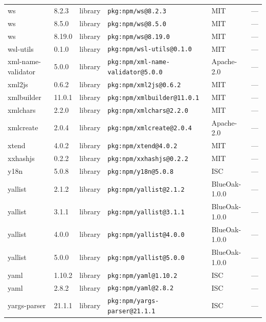 \documentclass[11pt,a4paper]{article}
\begin{document}
\begin{longtable}{|p{4cm}|p{2cm}|p{1.6cm}|p{5cm}|p{1.5cm}|p{3.5cm}|}
\raggedright ws & 8.2.3 & library & \small\texttt{pkg:npm/ws@8.2.3} & MIT & \small — \\
\raggedright ws & 8.5.0 & library & \small\texttt{pkg:npm/ws@8.5.0} & MIT & \small — \\
\raggedright ws & 8.19.0 & library & \small\texttt{pkg:npm/ws@8.19.0} & MIT & \small — \\
\raggedright wsl-utils & 0.1.0 & library & \small\texttt{pkg:npm/wsl-utils@0.1.0} & MIT & \small — \\
\raggedright xml-name-validator & 5.0.0 & library & \small\texttt{pkg:npm/xml-name-validator@5.0.0} & Apache-2.0 & \small — \\
\raggedright xml2js & 0.6.2 & library & \small\texttt{pkg:npm/xml2js@0.6.2} & MIT & \small — \\
\raggedright xmlbuilder & 11.0.1 & library & \small\texttt{pkg:npm/xmlbuilder@11.0.1} & MIT & \small — \\
\raggedright xmlchars & 2.2.0 & library & \small\texttt{pkg:npm/xmlchars@2.2.0} & MIT & \small — \\
\raggedright xmlcreate & 2.0.4 & library & \small\texttt{pkg:npm/xmlcreate@2.0.4} & Apache-2.0 & \small — \\
\raggedright xtend & 4.0.2 & library & \small\texttt{pkg:npm/xtend@4.0.2} & MIT & \small — \\
\raggedright xxhashjs & 0.2.2 & library & \small\texttt{pkg:npm/xxhashjs@0.2.2} & MIT & \small — \\
\raggedright y18n & 5.0.8 & library & \small\texttt{pkg:npm/y18n@5.0.8} & ISC & \small — \\
\raggedright yallist & 2.1.2 & library & \small\texttt{pkg:npm/yallist@2.1.2} & BlueOak-1.0.0 & \small — \\
\raggedright yallist & 3.1.1 & library & \small\texttt{pkg:npm/yallist@3.1.1} & BlueOak-1.0.0 & \small — \\
\raggedright yallist & 4.0.0 & library & \small\texttt{pkg:npm/yallist@4.0.0} & BlueOak-1.0.0 & \small — \\
\raggedright yallist & 5.0.0 & library & \small\texttt{pkg:npm/yallist@5.0.0} & BlueOak-1.0.0 & \small — \\
\raggedright yaml & 1.10.2 & library & \small\texttt{pkg:npm/yaml@1.10.2} & ISC & \small — \\
\raggedright yaml & 2.8.2 & library & \small\texttt{pkg:npm/yaml@2.8.2} & ISC & \small — \\
\raggedright yargs-parser & 21.1.1 & library & \small\texttt{pkg:npm/yargs-parser@21.1.1} & ISC & \small — \\

\end{longtable}
\end{document}
